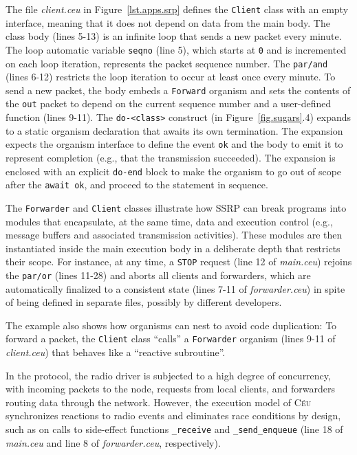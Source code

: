 \documentclass{sigplanconf}
\newcommand{\CEU}{\textsc{C\'{e}u}\xspace}
\newcommand{\code}[1] {{\small{\texttt{#1}}}}
\newcommand{\1}{\;}
\newcommand{\2}{\;\;}
\newcommand{\3}{\;\;\;}
\newcommand{\5}{\;\;\;\;\;}
\begin{document}
The file \emph{client.ceu} in Figure~\ref{lst.apps.srp} defines the 
\code{Client} class with an empty interface, meaning that it does not depend on 
data from the main body.
%
The class body (lines 5-13) is an infinite loop that sends a new packet
every minute.
The loop automatic variable \code{seqno} (line 5), which starts at \code{0} and 
is incremented on each loop iteration, represents the packet sequence number.
%
The \code{par/and} (lines 6-12) restricts the loop iteration to occur at least 
once every minute.
%
To send a new packet, the body embeds a \code{Forward} organism and sets the 
contents of the \code{out} packet to depend on the current sequence number and 
a user-defined function (lines 9-11).
The \code{do-<class>} construct (in Figure~\ref{fig.sugars}.4) expands to a 
static organism declaration that awaits its own termination.
%
The expansion expects the organism interface to define the event \code{ok} and 
the body to emit it to represent completion (e.g., that the transmission 
succeeded).
The expansion is enclosed with an explicit \code{do-end} block to make the 
organism to go out of scope after the \code{await ok}, and proceed to the 
statement in sequence.

The \code{Forwarder} and \code{Client} classes illustrate how SSRP can break 
programs into modules that encapsulate, at the same time, data and execution 
control (e.g., message buffers and associated transmission activities).
%
These modules are then instantiated inside the main execution body in a 
deliberate depth that restricts their scope.
%
For instance, at any time, a \code{STOP} request (line 12 of \emph{main.ceu}) 
rejoins the \code{par/or} (lines 11-28) and aborts all clients and forwarders, 
which are automatically finalized to a consistent state (lines 7-11 of 
\emph{forwarder.ceu}) in spite of being defined in separate files, possibly by 
different developers.

The example also shows how organisms can nest to avoid code duplication:
To forward a packet, the \code{Client} class ``calls'' a \code{Forwarder} 
organism (lines 9-11 of \emph{client.ceu}) that behaves like a ``reactive 
subroutine''.

In the protocol, the radio driver is subjected to a high degree of concurrency, 
with incoming packets to the node, requests from local clients, and forwarders 
routing data through the network.
However, the execution model of \CEU synchronizes reactions to radio events and 
eliminates race conditions by design, such as on calls to side-effect functions 
\code{\_receive} and \code{\_send\_enqueue} (line 18 of \emph{main.ceu} and 
line 8 of \emph{forwarder.ceu}, respectively).
\end{document}
